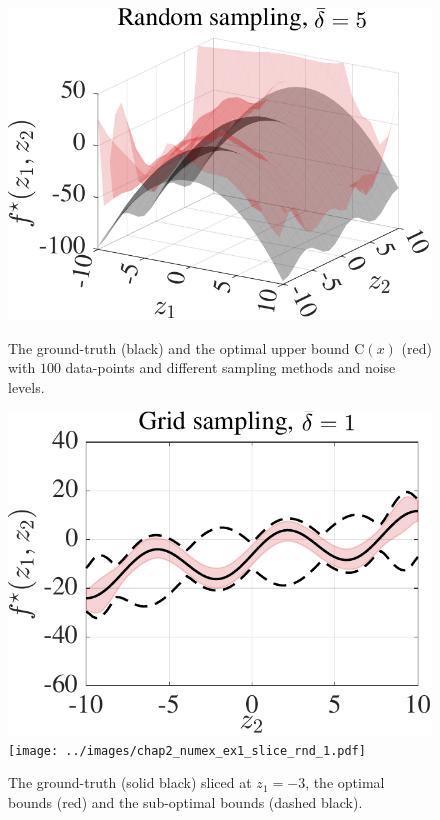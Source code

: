 \begin{figure}[t]
	\includegraphics[scale=0.4]{../images/chap2_numex_ex1_rnd_5.pdf} 
	\caption{The ground-truth (black) and the optimal upper bound C$(x)$ (red) with $100$ data-points and different sampling methods and noise levels.}
	\label{fig.numex_ex1_3d}
	\vspace{15pt}
	\includegraphics[scale=0.4]{../images/chap2_numex_ex1_slice_grid_1.pdf} \hspace{5pt}
	\texttt{[image: ../images/chap2\_numex\_ex1\_slice\_rnd\_1.pdf]} 
	\caption{The ground-truth (solid black) sliced at $z_1 = -3$, the optimal bounds (red) and the sub-optimal bounds (dashed black).}
	\label{fig.numex_ex1_2d}
\end{figure}

